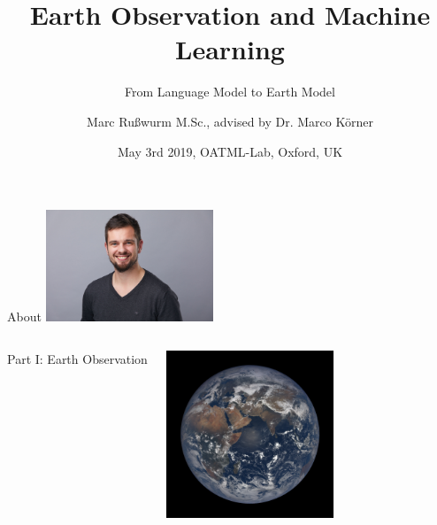 \documentclass[%
  aspectratio=169,
  9pt,
  USenglish,
  titlegraphic, %
  affiliationintitlepagehead,
  affiliation,
]{beamer}
\title{Earth Observation and Machine Learning}
\subtitle{From Language Model to Earth Model}
\author[M. Rußwurm]{Marc Rußwurm M.Sc., advised by Dr. Marco Körner}
\institute[TUM]{Technical University of Munich, Germany\\
	Remote Sensing Technology}
\date{May 3rd 2019, OATML-Lab, Oxford, UK}
\begin{document}
\begin{frame}[t]
\titlepage
\end{frame}


{
	\begin{frame}[plain]
	\vfill
	\begin{center}
		\Huge\color{tumgraydark}
		About
		\hspace{2em}\includegraphics[width=5cm]{images/marc}
	\end{center}
	\vfill
\end{frame}
}



{
	\begin{frame}[plain]
	
		\vfill
		\Huge\color{white}
		\begin{center}
			\begin{columns}
				\vspace{7em}
				
				\hfill 
				Part I: Earth Observation
				
				\includegraphics[width=5cm]{images/dscovrepic/epic1}
			\end{columns}
		\end{center}
		
		\vfill
	\end{frame}
}


\end{document}
